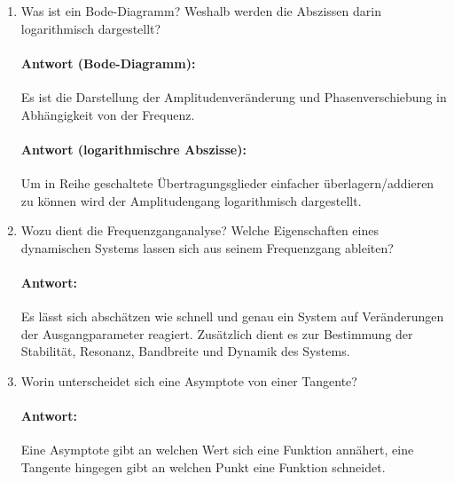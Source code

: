 \documentclass[12pt, a4paper]{article}
\begin{document}
\begin{enumerate}
    \item Was ist ein Bode-Diagramm? Weshalb werden die Abszissen darin logarithmisch dargestellt?
    \vspace{-16pt}\paragraph{Antwort (Bode-Diagramm):} Es ist die Darstellung der Amplitudenveränderung und Phasenverschiebung in Abhängigkeit von der Frequenz.
    \vspace{-16pt}\paragraph{Antwort (logarithmischre Abszisse):} Um in Reihe geschaltete Übertragungsglieder einfacher überlagern/addieren zu können wird der Amplitudengang logarithmisch dargestellt.
    
    \item Wozu dient die Frequenzganganalyse? Welche Eigenschaften eines dynamischen Systems lassen sich aus seinem Frequenzgang ableiten?
    \vspace{-16pt}\paragraph{Antwort:} Es lässt sich abschätzen wie schnell und genau ein System auf Veränderungen der Ausgangparameter reagiert. Zusätzlich dient es zur Bestimmung der Stabilität, Resonanz, Bandbreite und Dynamik des Systems.
    
    \item Worin unterscheidet sich eine Asymptote von einer Tangente?
    \vspace{-16pt}\paragraph{Antwort:} Eine Asymptote gibt an welchen Wert sich eine Funktion annähert, eine Tangente hingegen gibt an welchen Punkt eine Funktion schneidet.
    

\end{enumerate}
\end{document}
